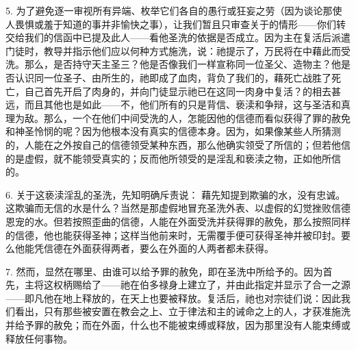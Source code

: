 5. 为了避免逐一审视所有异端、枚举它们各自的愚行或狂妄之劳（因为谈论那使人畏惧或羞于知道的事并非愉快之事），让我们暂且只审查关于的情形——你们转交给我们的信函中已提及此人——看他圣洗的依据是否成立。因为主在复活后派遣门徒时，教导并指示他们应以何种方式施洗，说：祂提示了，万民将在中藉此而受洗。那么，是否持守天主圣三？他是否像我们一样宣称同一位圣父、造物主？他是否认识同一位圣子、由所生的，祂即成了血肉，背负了我们的，藉死亡战胜了死亡，自己首先开启了肉身的，并向门徒显示祂已在这同一肉身中复活？的相去甚远，而且其他也是如此——不，他们所有的只是背信、亵渎和争辩，这与圣洁和真理为敌。那么，一个在他们中间受洗的人，怎能因他的信德而看似获得了罪的赦免和神圣怜悯的呢？因为他根本没有真实的信德本身。因为，如果像某些人所猜测的，人能在之外按自己的信德领受某种东西，那么他确实领受了所信的；但若他信的是虚假，就不能领受真实的；反而他所领受的是淫乱和亵渎之物，正如他所信的。\par

6. 关于这亵渎淫乱的圣洗，先知明确斥责说： 藉先知提到欺骗的水，没有忠诚。这欺骗而无信的水是什么？当然是那虚假地冒充圣洗外表、以虚假的幻觉挫败信德恩宠的水。但若按照歪曲的信德，人能在外面受洗并获得罪的赦免，那么按照同样的信德，他也能获得圣神；这样当他前来时，无需覆手便可获得圣神并被印封。要么他能凭信德在外面获得两者，要么在外面的人两者都未获得。\par

7. 然而，显然在哪里、由谁可以给予罪的赦免，即在圣洗中所给予的。因为首先，主将这权柄赐给了——祂在伯多禄身上建立了，并由此指定并显示了合一之源——即凡他在地上释放的，在天上也要被释放。复活后，祂也对宗徒们说：因此我们看出，只有那些被安置在教会之上、立于律法和主的诫命之上的人，才获准施洗并给予罪的赦免；而在外面，什么也不能被束缚或释放，因为那里没有人能束缚或释放任何事物。\par

